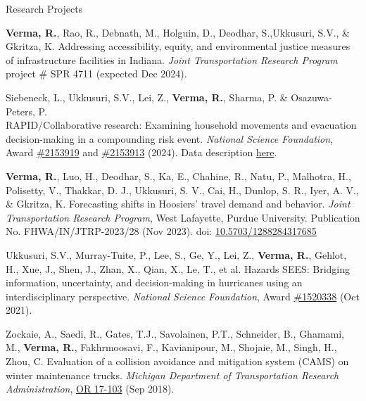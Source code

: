 \documentclass{CV} %
\begin{document}
\begin{rSection}{Research Projects}
    \begin{etaremune}
        \item \textbf{Verma, R.}, Rao, R., Debnath, M., Holguin, D., Deodhar, S.,Ukkusuri, S.V., \& Gkritza, K. Addressing accessibility, equity, and environmental justice measures of infrastructure facilities in Indiana. \textit{Joint Transportation Research Program} project \# SPR 4711 (expected Dec 2024).
        
        \item Siebeneck, L., Ukkusuri, S.V., Lei, Z., \textbf{Verma, R.}, Sharma, P. \& Osazuwa-Peters, P. \\
        RAPID/Collaborative research: Examining household movements and evacuation decision-making in a compounding risk event. \textit{National Science Foundation}, Award \href{https://www.nsf.gov/awardsearch/showAward?AWD_ID=2153919}{\#2153919} and \href{https://www.nsf.gov/awardsearch/showAward?AWD_ID=2153913&HistoricalAwards=false}{\#2153913} (2024). Data description \href{https://digital.library.unt.edu/ark:/67531/metadc1872507/}{here}.

        \item \textbf{Verma, R.}, Luo, H., Deodhar, S., Ka, E., Chahine, R., Natu, P., Malhotra, H., Polisetty, V., Thakkar, D. J., Ukkusuri, S. V., Cai, H., Dunlop, S. R., Iyer, A. V., \& Gkritza, K. Forecasting shifts in Hoosiers' travel demand and behavior. \textit{Joint Transportation Research Program}, West Lafayette, Purdue University. Publication No. FHWA/IN/JTRP-2023/28 (Nov 2023). doi: \href{https://doi.org/10.5703/1288284317685}{10.5703/1288284317685}

        \item Ukkusuri, S.V., Murray-Tuite, P., Lee, S., Ge, Y., Lei, Z., \textbf{Verma, R.}, Gehlot, H., Xue, J., Shen, J., Zhan, X., Qian, X., Le, T., et al. Hazards SEES: Bridging information, uncertainty, and decision-making in hurricanes using an interdisciplinary perspective. \textit{National Science Foundation}, Award \href{https://www.nsf.gov/awardsearch/showAward?AWD_ID=1520338}{\#1520338} (Oct 2021).
        
        \item Zockaie, A., Saedi, R., Gates, T.J., Savolainen, P.T., Schneider, B., Ghamami, M., \textbf{Verma, R.}, Fakhrmoosavi, F., Kavianipour, M., Shojaie, M., Singh, H., Zhou, C. Evaluation of a collision avoidance and mitigation system (CAMS) on winter maintenance trucks. \textit{Michigan Department of Transportation Research Administration}, \href{https://rosap.ntl.bts.gov/view/dot/42752}{OR 17-103} (Sep 2018).
    \end{etaremune}

\end{rSection}
\end{document}
